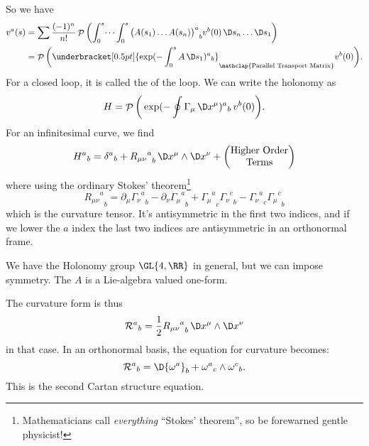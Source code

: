 So we have
\begin{equation}
\begin{split}
v^{a}(s)
&= \sum\frac{(-1)^{n}}{n!}\pathOrder\left(
\int^{s}_{0}\dots\int^{s}_{0}
{\bigl(A(s_{1})\dots A(s_{n})\bigr)^{a}}_{b}v^{b}(0)\,\D
s_{n}\dots\D s_{1}
\right)\\
&=\pathOrder\bigg(\underbracket[0.5pt]{\exp(-\int^{s}_{0}A\,\D
  s_{1}){{}^{a}}_{b}}_{\mathclap{\text{Parallel Transport Matrix}}}v^{b}(0)\bigg).
\end{split}
\end{equation}
For a closed loop, it is called the  of the
loop. We can write the holonomy as
\begin{equation}
H =
\pathOrder\bigg(\exp(-\oint\Gamma_{\mu}\,\D x^{\mu}){{}^{a}}_{b}\,v^{b}(0)\bigg).
\end{equation}
For an infinitesimal curve, we find
\begin{equation}
{H^{a}}_{b}={\delta^{a}}_{b}
+{{R_{\mu\nu}}^{a}}_{b}\,\D x^{\mu}\wedge\D x^{\nu}
+\begin{pmatrix}\mbox{Higher %
Order}\\
\mbox{Terms}
\end{pmatrix}
\end{equation}
where using the ordinary Stokes' theorem\footnote{Mathematicians
  call \emph{everything} ``Stokes' theorem'', so be forewarned
  gentle physicist!}
\begin{equation}
{{R_{\mu\nu}}^{a}}_{b}=\partial_{\mu}{{\Gamma_{\nu}}^{a}}_{b}
-\partial_{\nu}{{\Gamma_{\mu}}^{a}}_{b}
+{{\Gamma_{\mu}}^{a}}_{c}{{\Gamma_{\nu}}^{c}}_{b}
-{{\Gamma_{\nu}}^{a}}_{c}{{\Gamma_{\mu}}^{c}}_{b}
\end{equation}
which is the curvature tensor. It's antisymmetric in the first
two indices, and if we lower the $a$ index the last two indices
are antisymmetric in an orthonormal frame.

\begin{rmk}
We have the Holonomy group $\GL{4,\RR}$ in general, but we can
impose symmetry. The $A$ is a Lie-algebra valued one-form.
\end{rmk}

The curvature form is thus
\begin{equation}\label{eq:curvatureTwoFormDefn}
{\mathcal{R}^{a}}_{b}=\frac{1}{2}{{R_{\mu\nu}}^{a}}_{b}\,\D x^{\mu}\wedge\D x^{\nu}
\end{equation}
in that case. In an orthonormal basis, the equation for curvature becomes:
\begin{equation}\label{eq:cartanSecondStructEqn}
{\mathcal{R}^{a}}_{b}=\D{\omega^{a}}_{b}+{\omega^{a}}_{c}\wedge{\omega^{c}}_{b}.
\end{equation}
This is the second Cartan structure equation.

